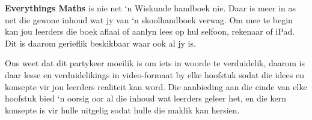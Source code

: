 \par
{\Large
% 
% 
% 
% 
% 

\textbf{Everythings Maths} is nie net ‘n Wiskunde handboek nie. Daar is meer in as net die gewone inhoud wat jy van ‘n skoolhandboek verwag. Om mee te begin kan jou leerders die boek aflaai of aanlyn lees op hul selfoon, rekenaar of iPad. Dit is daarom gerieflik beskikbaar waar ook al jy is.\par

Ons weet dat dit partykeer moeilik is om iets in woorde te verduidelik, daarom is daar lesse en verduidelikings in video-formaat by elke hoofstuk sodat die idees en konsepte vir jou leerders realiteit kan word. Die aanbieding aan die einde van elke hoofstuk bied ‘n oorsig oor al die inhoud wat leerders geleer het, en die kern konsepte is vir hulle uitgelig sodat hulle die maklik kan hersien. \par

}
